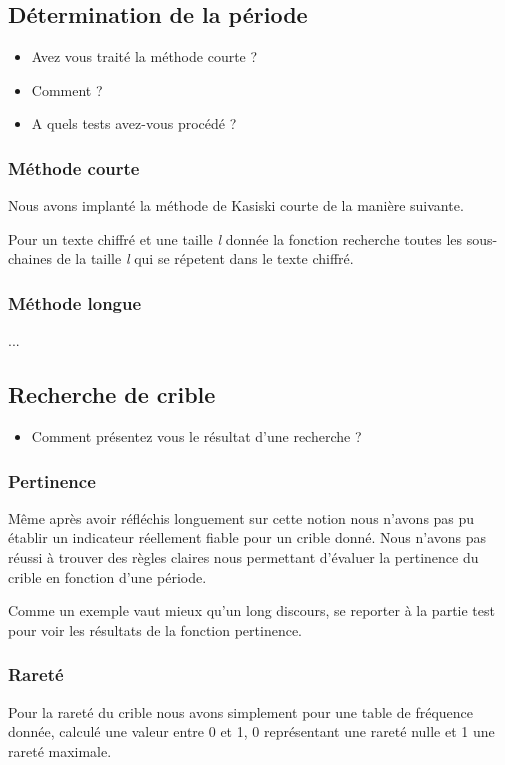 \documentclass[a4paper, 11pt]{article}
\begin{document}
\subsection{Détermination de la période}

\begin{itemize}
\item Avez vous traité la méthode courte ?
\item Comment ?
\item A quels tests avez-vous procédé ?
\end{itemize}


\subsubsection{Méthode courte}
Nous avons implanté la méthode de Kasiski courte de la manière
suivante.

Pour un texte chiffré et une taille \textit{l} donnée la fonction recherche toutes
les sous-chaines de la taille \textit{l} qui se répetent dans le texte
chiffré.

\subsubsection{Méthode longue}
... 

\subsection{Recherche de crible}
\begin{itemize}
\item Comment présentez vous le résultat d'une recherche ?
\end{itemize}
\subsubsection{Pertinence}
Même après avoir réfléchis longuement sur cette notion nous n'avons
pas pu établir un indicateur réellement fiable pour un crible donné.
Nous n'avons pas réussi à trouver des règles claires nous permettant
d'évaluer la pertinence du crible en fonction d'une période.

Comme un exemple vaut mieux qu'un long discours, se reporter à la
partie test pour voir les résultats de la fonction pertinence.


\subsubsection{Rareté}
Pour la rareté du crible nous avons simplement pour une table de
fréquence donnée, calculé une valeur entre 0 et 1, 0 représentant une
rareté nulle et 1 une rareté maximale.
\end{document}

